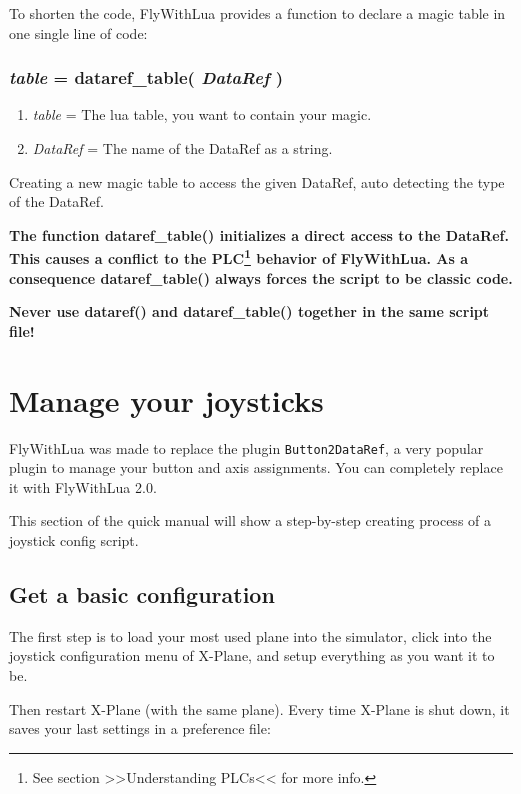 \documentclass[11pt,parskip=half,a4paper]{scrartcl}
\begin{document}
To shorten the code, FlyWithLua provides a function to declare a magic table in one single line of code:

\subsubsection{\emph{table} = dataref\_table( \emph{DataRef} )}

\begin{enumerate}
	\item \emph{table} = The lua table, you want to contain your magic.
	\item \emph{DataRef} = The name of the DataRef as a string.
\end{enumerate}

Creating a new magic table to access the given DataRef, auto detecting the type of the DataRef.

\vspace{2ex}

\textbf{The function dataref\_table() initializes a direct access to the DataRef. This causes a conflict to the PLC\footnote{See section >>Understanding PLCs<< for more info.} behavior of FlyWithLua. As a consequence dataref\_table() always forces the script to be classic code.}

\textbf{Never use dataref() and dataref\_table() together in the same script file!}

\newpage
\section{Manage your joysticks}

FlyWithLua was made to replace the plugin \verb|Button2DataRef|, a very popular plugin to manage your button and axis assignments. You can completely replace it with FlyWithLua 2.0.

This section of the quick manual will show a step-by-step creating process of a joystick config script.

\subsection{Get a basic configuration}

The first step is to load your most used plane into the simulator, click into the joystick configuration menu of X-Plane, and setup everything as you want it to be.

Then restart X-Plane (with the same plane). Every time X-Plane is shut down, it saves your last settings in a preference file:
\end{document}
